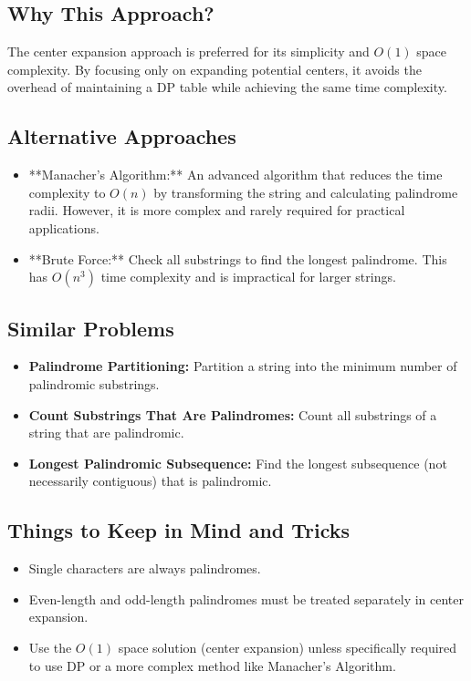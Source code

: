 \subsection*{Why This Approach?}
The center expansion approach is preferred for its simplicity and \(O(1)\) space complexity. By focusing only on expanding potential centers, it avoids the overhead of maintaining a DP table while achieving the same time complexity.

\subsection*{Alternative Approaches}
\begin{itemize}
    \item **Manacher's Algorithm:**  
    An advanced algorithm that reduces the time complexity to \(O(n)\) by transforming the string and calculating palindrome radii. However, it is more complex and rarely required for practical applications.
    \item **Brute Force:**  
    Check all substrings to find the longest palindrome. This has \(O(n^3)\) time complexity and is impractical for larger strings.
\end{itemize}

\subsection*{Similar Problems}
\begin{itemize}
    \item \textbf{Palindrome Partitioning:} Partition a string into the minimum number of palindromic substrings.
    \item \textbf{Count Substrings That Are Palindromes:} Count all substrings of a string that are palindromic.
    \item \textbf{Longest Palindromic Subsequence:} Find the longest subsequence (not necessarily contiguous) that is palindromic.
\end{itemize}

\subsection*{Things to Keep in Mind and Tricks}
\begin{itemize}
    \item Single characters are always palindromes.
    \item Even-length and odd-length palindromes must be treated separately in center expansion.
    \item Use the \(O(1)\) space solution (center expansion) unless specifically required to use DP or a more complex method like Manacher's Algorithm.
\end{itemize}

